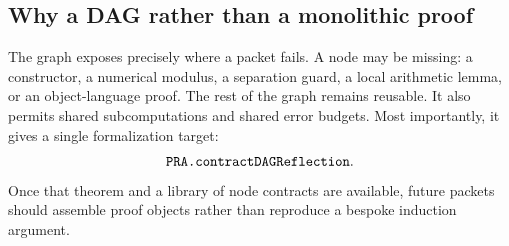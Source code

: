 \subsection{Why a DAG rather than a monolithic proof}

The graph exposes precisely where a packet fails.  A node may be missing:
a constructor, a numerical modulus, a separation guard, a local arithmetic
lemma, or an object-language proof.  The rest of the graph remains reusable.
It also permits shared subcomputations and shared error budgets.  Most
importantly, it gives a single formalization target:
\[
       \texttt{PRA.contractDAGReflection}.
\]
Once that theorem and a library of node contracts are available, future
packets should assemble proof objects rather than reproduce a bespoke
induction argument.
